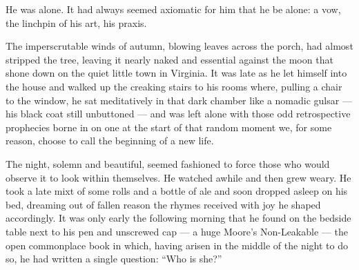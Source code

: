   He was alone. It had always seemed axiomatic for him that he be alone: a vow,
the linchpin 
of his art, his praxis.

  The imperscrutable 
winds of autumn, blowing leaves across the porch, had
almost stripped the tree, leaving it nearly naked and essential against the moon
that shone down on the quiet little town in Virginia. It was late as he let
himself into the house and walked up the creaking stairs to his rooms where,
pulling a chair to the window, he sat meditatively in that dark chamber like a
nomadic gulsar
--- his black coat still unbuttoned --- and was left alone with those odd
retrospective prophecies borne in on one at the start of that random moment we,
for some reason, choose to call the beginning of a new life.

  The night, solemn and beautiful, seemed fashioned to force those who would
observe it to look within themselves. He watched awhile and then grew weary. He
took a late mixt 
of some rolls and a bottle of ale and soon dropped asleep on
his bed, dreaming out of fallen reason the rhymes received with joy he shaped
accordingly. It was only early the following morning that he found on the
bedside table next to his pen and unscrewed cap --- a huge Moore's Non-Leakable
--- the open commonplace book in which, having arisen in the middle of the 
night to do so, he had written a single question: ``Who is she?''
